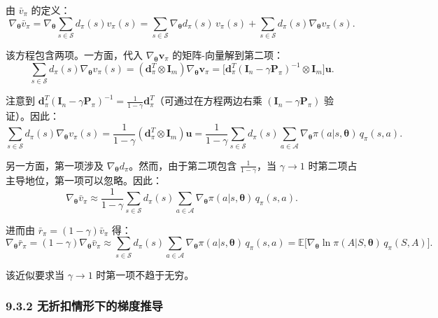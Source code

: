 \documentclass[UTF8]{article}
\begin{document}
\begin{proofbox}
由 $\bar{v}_\pi$ 的定义：
\[
\nabla_{\boldsymbol{\theta}} \bar{v}_\pi = \nabla_{\boldsymbol{\theta}} \sum_{s \in \mathcal{S}} d_\pi(s) v_\pi(s)
= \sum_{s \in \mathcal{S}} \nabla_{\boldsymbol{\theta}} d_\pi(s) \, v_\pi(s) + \sum_{s \in \mathcal{S}} d_\pi(s) \nabla_{\boldsymbol{\theta}} v_\pi(s).
\]

该方程包含两项。一方面，代入 $\nabla_{\boldsymbol{\theta}} \boldsymbol{v}_\pi$ 的矩阵-向量解到第二项：
\[
\sum_{s \in \mathcal{S}} d_\pi(s) \nabla_{\boldsymbol{\theta}} v_\pi(s) = (\boldsymbol{d}_\pi^T \otimes \boldsymbol{I}_m) \nabla_{\boldsymbol{\theta}} \boldsymbol{v}_\pi
= \bigl[ \boldsymbol{d}_\pi^T (\boldsymbol{I}_n - \gamma \boldsymbol{P}_\pi)^{-1} \otimes \boldsymbol{I}_m \bigr] \boldsymbol{u}.
\]

注意到 $\boldsymbol{d}_\pi^T (\boldsymbol{I}_n - \gamma \boldsymbol{P}_\pi)^{-1} = \frac{1}{1-\gamma} \boldsymbol{d}_\pi^T$（可通过在方程两边右乘 $(\boldsymbol{I}_n - \gamma \boldsymbol{P}_\pi)$ 验证）。因此：
\[
\sum_{s \in \mathcal{S}} d_\pi(s) \nabla_{\boldsymbol{\theta}} v_\pi(s) = \frac{1}{1-\gamma} (\boldsymbol{d}_\pi^T \otimes \boldsymbol{I}_m) \boldsymbol{u}
= \frac{1}{1-\gamma} \sum_{s \in \mathcal{S}} d_\pi(s) \sum_{a \in \mathcal{A}} \nabla_{\boldsymbol{\theta}} \pi(a|s, \boldsymbol{\theta}) \, q_\pi(s,a).
\]

另一方面，第一项涉及 $\nabla_{\boldsymbol{\theta}} d_\pi$。然而，由于第二项包含 $\frac{1}{1-\gamma}$，当 $\gamma \to 1$ 时第二项占主导地位，第一项可以忽略。因此：
\[
\nabla_{\boldsymbol{\theta}} \bar{v}_\pi \approx \frac{1}{1-\gamma} \sum_{s \in \mathcal{S}} d_\pi(s) \sum_{a \in \mathcal{A}} \nabla_{\boldsymbol{\theta}} \pi(a|s, \boldsymbol{\theta}) \, q_\pi(s,a).
\]

进而由 $\bar{r}_\pi = (1 - \gamma) \bar{v}_\pi$ 得：
\[
\nabla_{\boldsymbol{\theta}} \bar{r}_\pi = (1 - \gamma) \nabla_{\boldsymbol{\theta}} \bar{v}_\pi
\approx \sum_{s \in \mathcal{S}} d_\pi(s) \sum_{a \in \mathcal{A}} \nabla_{\boldsymbol{\theta}} \pi(a|s, \boldsymbol{\theta}) \, q_\pi(s,a)
= \mathbb{E}\bigl[ \nabla_{\boldsymbol{\theta}} \ln \pi(A|S, \boldsymbol{\theta}) \, q_\pi(S, A) \bigr].
\]

该近似要求当 $\gamma \to 1$ 时第一项不趋于无穷。
\end{proofbox}

\subsubsection*{9.3.2 无折扣情形下的梯度推导}
\end{document}
